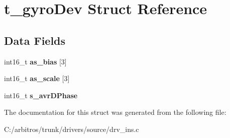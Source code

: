 \hypertarget{structt__gyro_dev}{\section{t\-\_\-gyro\-Dev Struct Reference}
\label{structt__gyro_dev}
}
\subsection*{Data Fields}
\begin{DoxyCompactItemize}
\item 
\hypertarget{structt__gyro_dev_ab09e9163fcbdd1f8df41f93844da2d68}{int16\-\_\-t {\bfseries as\-\_\-bias} \mbox{[}3\mbox{]}}\label{structt__gyro_dev_ab09e9163fcbdd1f8df41f93844da2d68}

\item 
\hypertarget{structt__gyro_dev_a090c73eef857227542434acce66453fd}{int16\-\_\-t {\bfseries as\-\_\-scale} \mbox{[}3\mbox{]}}\label{structt__gyro_dev_a090c73eef857227542434acce66453fd}

\item 
\hypertarget{structt__gyro_dev_aca62995f95b202152e551dd42962f7c0}{int16\-\_\-t {\bfseries s\-\_\-avr\-D\-Phase}}\label{structt__gyro_dev_aca62995f95b202152e551dd42962f7c0}

\end{DoxyCompactItemize}


The documentation for this struct was generated from the following file\-:\begin{DoxyCompactItemize}
\item 
C\-:/arbitros/trunk/drivers/source/drv\-\_\-ins.\-c\end{DoxyCompactItemize}
